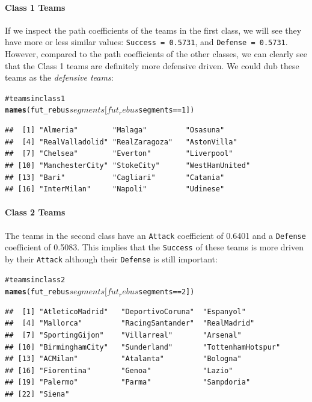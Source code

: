 \documentclass[12pt]{book}\usepackage{graphicx, color}
\makeatletter
\newcommand{\hlfunctioncall}[1]{\textcolor[rgb]{0.501960784313725,0,0.329411764705882}{\textbf{#1}}}%
\newcommand{\hlcomment}[1]{\textcolor[rgb]{0.180392156862745,0.6,0.341176470588235}{#1}}%
\newenvironment{kframe}{%
 \def\at@end@of@kframe{}%
 \ifinner\ifhmode%
  \def\at@end@of@kframe{\end{minipage}}%
  \begin{minipage}{\columnwidth}%
 \fi\fi%
 \def\FrameCommand##1{\hskip\@totalleftmargin \hskip-\fboxsep
 \colorbox{shadecolor}{##1}\hskip-\fboxsep
     \hskip-\linewidth \hskip-\@totalleftmargin \hskip\columnwidth}%
 \MakeFramed {\advance\hsize-\width
   \@totalleftmargin\z@ \linewidth\hsize
   \@setminipage}}%
 {\par\unskip\endMakeFramed%
 \at@end@of@kframe}
\newenvironment{knitrout}{}{} %
\newcommand{\code}[1]{\texttt{#1}}
\makeatother
\begin{document}
\paragraph{Class 1 Teams} If we inspect the path coefficients of the teams in the first class, we will see they have more or less similar values: \code{Success = 0.5731}, and \code{Defense = 0.5731}. However, compared to the path coefficients of the other classes, we can clearly see that the Class 1 teams are definitely more defensive driven. We could dub these teams as the \textit{defensive teams}:
\begin{knitrout}
\color{fgcolor}\begin{kframe}
\begin{alltt}
\hlcomment{# teams in class 1}
\hlfunctioncall{names}(fut_rebus$segments[fut_rebus$segments == 1])
\end{alltt}
\begin{verbatim}
##  [1] "Almeria"        "Malaga"         "Osasuna"       
##  [4] "RealValladolid" "RealZaragoza"   "AstonVilla"    
##  [7] "Chelsea"        "Everton"        "Liverpool"     
## [10] "ManchesterCity" "StokeCity"      "WestHamUnited" 
## [13] "Bari"           "Cagliari"       "Catania"       
## [16] "InterMilan"     "Napoli"         "Udinese"
\end{verbatim}
\end{kframe}
\end{knitrout}


\paragraph{Class 2 Teams} The teams in the second class have an \code{Attack} coefficient of 0.6401 and a \code{Defense} coefficient of 0.5083. This implies that the \code{Success} of these teams is more driven by their \code{Attack} although their \code{Defense} is still important:
\begin{knitrout}
\color{fgcolor}\begin{kframe}
\begin{alltt}
\hlcomment{# teams in class 2}
\hlfunctioncall{names}(fut_rebus$segments[fut_rebus$segments == 2])
\end{alltt}
\begin{verbatim}
##  [1] "AtleticoMadrid"   "DeportivoCoruna"  "Espanyol"        
##  [4] "Mallorca"         "RacingSantander"  "RealMadrid"      
##  [7] "SportingGijon"    "Villarreal"       "Arsenal"         
## [10] "BirminghamCity"   "Sunderland"       "TottenhamHotspur"
## [13] "ACMilan"          "Atalanta"         "Bologna"         
## [16] "Fiorentina"       "Genoa"            "Lazio"           
## [19] "Palermo"          "Parma"            "Sampdoria"       
## [22] "Siena"
\end{verbatim}
\end{kframe}
\end{knitrout}
\end{document}
